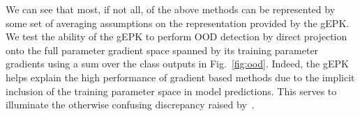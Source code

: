 We can see that most, if not all, of the above methods can be represented by some set of averaging assumptions on the representation provided by the gEPK. We test the ability of the gEPK to perform OOD detection by direct projection onto the full parameter gradient space spanned by its training parameter gradients using a sum over the class outputs in Fig.~\ref{fig:ood}. Indeed, the gEPK helps explain the high performance of gradient based methods due to the implicit inclusion of the training parameter space in model predictions. This serves to illuminate the otherwise confusing discrepancy raised by~\citet{igoe2022}. 

\begin{figure}[t]
\begin{center}
\end{center}
\end{figure}
